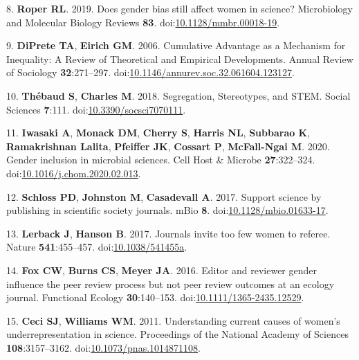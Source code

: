 \documentclass[11pt,]{article}
\begin{document}
\hypertarget{ref-Roper2019}{}
8. \textbf{Roper RL}. 2019. Does gender bias still affect women in
science? Microbiology and Molecular Biology Reviews \textbf{83}.
doi:\href{https://doi.org/10.1128/mmbr.00018-19}{10.1128/mmbr.00018-19}.

\hypertarget{ref-diprete_cumulative_2006}{}
9. \textbf{DiPrete TA}, \textbf{Eirich GM}. 2006. Cumulative Advantage
as a Mechanism for Inequality: A Review of Theoretical and Empirical
Developments. Annual Review of Sociology \textbf{32}:271--297.
doi:\href{https://doi.org/10.1146/annurev.soc.32.061604.123127}{10.1146/annurev.soc.32.061604.123127}.

\hypertarget{ref-thebaud_segregation_2018}{}
10. \textbf{Thébaud S}, \textbf{Charles M}. 2018. Segregation,
Stereotypes, and STEM. Social Sciences \textbf{7}:111.
doi:\href{https://doi.org/10.3390/socsci7070111}{10.3390/socsci7070111}.

\hypertarget{ref-Iwasaki2020}{}
11. \textbf{Iwasaki A}, \textbf{Monack DM}, \textbf{Cherry S},
\textbf{Harris NL}, \textbf{Subbarao K}, \textbf{Ramakrishnan
\textnormal{Lalita}}, \textbf{Pfeiffer JK}, \textbf{Cossart P},
\textbf{McFall-Ngai M}. 2020. Gender inclusion in microbial sciences.
Cell Host \& Microbe \textbf{27}:322--324.
doi:\href{https://doi.org/10.1016/j.chom.2020.02.013}{10.1016/j.chom.2020.02.013}.

\hypertarget{ref-Schloss2017}{}
12. \textbf{Schloss PD}, \textbf{Johnston M}, \textbf{Casadevall A}.
2017. Support science by publishing in scientific society journals. mBio
\textbf{8}.
doi:\href{https://doi.org/10.1128/mbio.01633-17}{10.1128/mbio.01633-17}.

\hypertarget{ref-lerback_journals_2017}{}
13. \textbf{Lerback J}, \textbf{Hanson B}. 2017. Journals invite too few
women to referee. Nature \textbf{541}:455--457.
doi:\href{https://doi.org/10.1038/541455a}{10.1038/541455a}.

\hypertarget{ref-fox_editor_2016}{}
14. \textbf{Fox CW}, \textbf{Burns CS}, \textbf{Meyer JA}. 2016. Editor
and reviewer gender influence the peer review process but not peer
review outcomes at an ecology journal. Functional Ecology
\textbf{30}:140--153.
doi:\href{https://doi.org/10.1111/1365-2435.12529}{10.1111/1365-2435.12529}.

\hypertarget{ref-ceci_understanding_2011}{}
15. \textbf{Ceci SJ}, \textbf{Williams WM}. 2011. Understanding current
causes of women's underrepresentation in science. Proceedings of the
National Academy of Sciences \textbf{108}:3157--3162.
doi:\href{https://doi.org/10.1073/pnas.1014871108}{10.1073/pnas.1014871108}.
\end{document}
